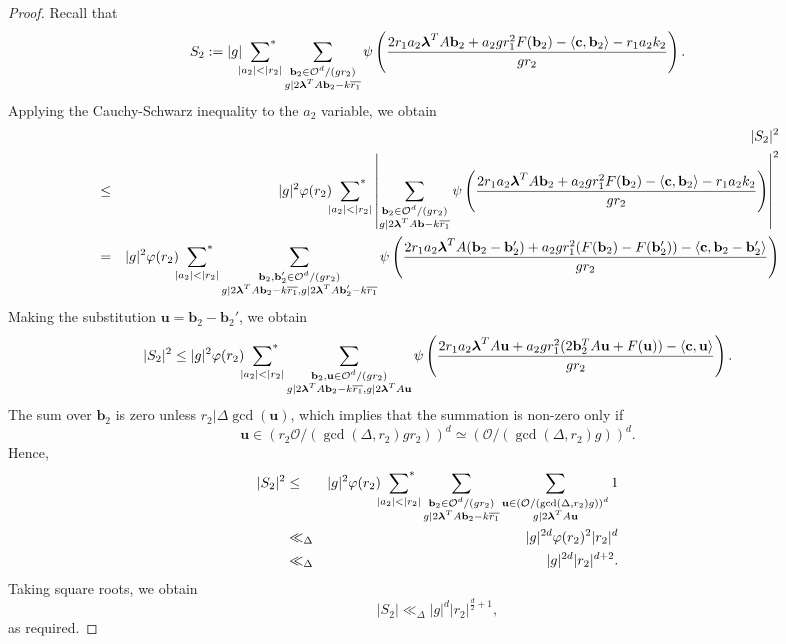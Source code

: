\documentclass[11pt]{amsart}
\theoremstyle{plain}
\theoremstyle{plain}
\renewcommand{\vec}[1]{\mathbf{#1}}
\theoremstyle{remark}
\theoremstyle{definition}
\newcommand{\sumstar}{\sideset{}{^*}\sum}
\begin{document}
\begin{proof}
Recall that
\[S_2:=|g|\sumstar_{|a_2|<|r_2|}\sum_{\substack{\vec{b}_2\in \mathcal{O}^d/(gr_2)\\ g|2\boldsymbol{\lambda}^TA\vec{b}_2-k\overline{r_1}}}  \psi\left(\frac{2r_1a_2\boldsymbol{\lambda}^TA\vec{b}_2+a_2gr_1^2F(\vec{b}_2)-\left<\vec{c},\vec{b}_2\right>-r_1a_2k_2}{gr_2}\right).\]
Applying the Cauchy-Schwarz inequality to the $a_2$ variable, we obtain
\begin{eqnarray*}
&&|S_2|^2\\&\leq& |g|^2\varphi(r_2)\sumstar_{|a_2|<|r_2|}\left|\sum_{\substack{\vec{b}_2\in \mathcal{O}^d/(gr_2)\\ g|2\boldsymbol{\lambda}^TA\vec{b}-k\overline{r_1}}}  \psi\left(\frac{2r_1a_2\boldsymbol{\lambda}^TA\vec{b}_2+a_2gr_1^2F(\vec{b}_2)-\left<\vec{c},\vec{b}_2\right>-r_1a_2k_2}{gr_2}\right)\right|^2\\ &=& |g|^2\varphi(r_2)\sumstar_{|a_2|<|r_2|}\sum_{\substack{\vec{b}_2,\vec{b}_2'\in \mathcal{O}^d/(gr_2)\\ g|2\boldsymbol{\lambda}^TA\vec{b}_2-k\overline{r_1}, g|2\boldsymbol{\lambda}^TA\vec{b}_2'-k\overline{r_1}}}  \psi\left(\frac{2r_1a_2\boldsymbol{\lambda}^TA(\vec{b}_2-\vec{b}_2')+a_2gr_1^2(F(\vec{b}_2)-F(\vec{b}_2'))-\left<\vec{c},\vec{b}_2-\vec{b}_2'\right>}{gr_2}\right)
\end{eqnarray*}
Making the substitution $\vec{u}=\vec{b}_2-\vec{b}_2'$, we obtain
\[|S_2|^2\leq |g|^2\varphi(r_2)\sumstar_{|a_2|<|r_2|}\sum_{\substack{\vec{b}_2,\vec{u}\in \mathcal{O}^d/(gr_2)\\ g|2\boldsymbol{\lambda}^TA\vec{b}_2-k\overline{r_1}, g|2\boldsymbol{\lambda}^TA\vec{u}}}  \psi\left(\frac{2r_1a_2\boldsymbol{\lambda}^TA\vec{u}+a_2gr_1^2(2\vec{b}_2^TA\vec{u}+F(\vec{u}))-\left<\vec{c},\vec{u}\right>}{gr_2}\right).\]
The sum over $\vec{b}_2$ is zero unless $r_2|\Delta\gcd(\vec{u})$, which implies that the summation is non-zero only if
\[\vec{u}\in(r_2\mathcal{O}/(\gcd(\Delta,r_2)gr_2))^d\simeq (\mathcal{O}/(\gcd(\Delta,r_2)g))^d.\]
Hence,
\begin{eqnarray*}|S_2|^2&\leq& |g|^2\varphi(r_2)\sumstar_{|a_2|<|r_2|}\sum_{\substack{\vec{b}_2\in \mathcal{O}^d/(gr_2)\\g|2\boldsymbol{\lambda}^TA\vec{b}_2-k\overline{r_1}}}\sum_{\substack{\vec{u}\in (\mathcal{O}/(\gcd(\Delta,r_2)g))^d\\ g|2\boldsymbol{\lambda}^TA\vec{u}}}1\\&\ll_{\Delta}& |g|^{2d}\varphi(r_2)^2|r_2|^d\\&\ll_{\Delta}& |g|^{2d}|r_2|^{d+2}.\end{eqnarray*}
Taking square roots, we obtain
\[|S_2|\ll_{\Delta}|g|^{d}|r_2|^{\frac{d}{2}+1},\]
as required.
\end{proof}
\end{document}
